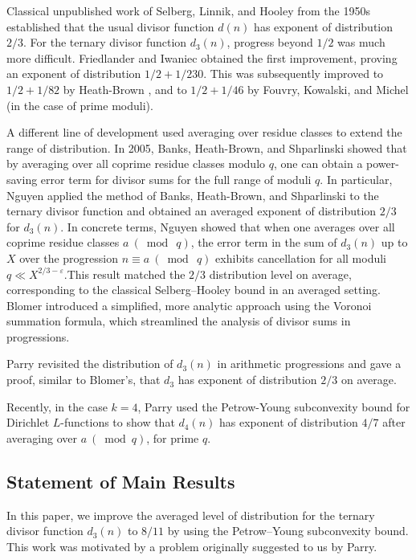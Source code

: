 \documentclass[oneside,reqno,10pt]{amsart}
\numberwithin{equation}{section}
\theoremstyle{plain}
\theoremstyle{definition}
\numberwithin{equation}{section}
\begin{document}
Classical unpublished work of Selberg, Linnik, and Hooley from the 1950s established that the usual divisor function $d(n)$ has exponent of distribution $2/3$. For the ternary divisor function $d_3(n)$, progress beyond $1/2$ was much more difficult. Friedlander and Iwaniec \cite{FI} obtained the first improvement, proving an exponent of distribution $1/2+1/230$. This was subsequently improved to $1/2+1/82$ by Heath-Brown \cite{HB}, and to $1/2+1/46$ by Fouvry, Kowalski, and Michel \cite{FKM} (in the case of prime moduli).

A different line of development used averaging over residue classes to extend the range of distribution. In 2005, Banks, Heath-Brown, and Shparlinski \cite{BHS} showed that by averaging over all coprime residue classes modulo $q$, one can obtain a power-saving error term for divisor sums for the full range of moduli $q$. In particular, Nguyen \cite{Ng} applied the method of Banks, Heath-Brown, and Shparlinski to the ternary divisor function and obtained an averaged exponent of distribution $2/3$ for $d_3(n)$. In concrete terms, Nguyen showed that when one averages over all coprime residue classes $a\  (\bmod\  q)$, the error term in the sum of $d_3(n)$ up to $X$ over the progression $n\equiv a\  (\bmod\  q)$ exhibits cancellation for all moduli $q\ll X^{2/3-\varepsilon}$.This result matched the
$2/3$ distribution level on average, corresponding to the classical Selberg–Hooley bound in an averaged setting. Blomer \cite{Bl} introduced a simplified, more analytic approach using the Voronoi summation formula, which streamlined the analysis of divisor sums in progressions.
 
Parry \cite{Pa1} revisited the distribution of $d_3(n)$ in arithmetic progressions and gave a proof, similar to Blomer’s, that $d_3$ has exponent of distribution $2/3$ on average.

Recently, in the case $k=4$, Parry \cite{Pa2} used the Petrow-Young \cite{PY} subconvexity bound for Dirichlet $L$-functions to show that $d_4(n)$ has exponent of distribution $4/7$ after averaging over $a\  (\bmod q)$, for prime $q$.

\subsection{Statement of Main Results}
 In this paper, we improve the averaged level of distribution for the ternary divisor function $d_3(n)$  to $8/11$ by using the Petrow–Young \cite{PY} subconvexity bound. This work was motivated by a problem originally suggested to us by Parry.
 
\end{document}
